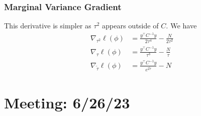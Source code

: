 \documentclass[12pt]{article}
\begin{document}
\subsubsection{Marginal Variance Gradient}
This derivative is simpler as $\tau^2$ appears outside of $C$. We have 
\begin{align*}
\nabla_{\tau^2} \ell(\phi) &= \frac{y^\top C^{-1} y}{2\tau^4} - \frac{N}{2\tau^2} \\
\nabla_{\tau} \ell(\phi) &= \frac{y^\top C^{-1} y}{\tau^3} - \frac{N}{\tau} \\
\nabla_{\tilde{\tau}} \ell(\phi) &= \frac{y^\top C^{-1} y}{e^{2\tilde{\tau}}} - N
\end{align*}

\section{Meeting: 6/26/23}
\end{document}
